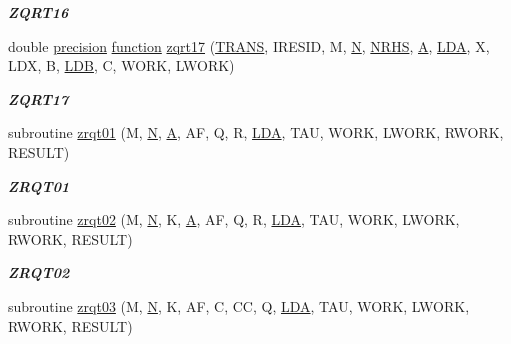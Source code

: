 \begin{DoxyCompactItemize}
\begin{DoxyCompactList}\small\item\em {\bfseries Z\+Q\+R\+T16} \end{DoxyCompactList}\item 
double \hyperlink{numinquire_8h_a2c8e616467665d0b2814d4c1589ba74e}{precision} \hyperlink{afunc_8m_a7b5e596df91eadea6c537c0825e894a7}{function} \hyperlink{group__complex16__lin_gac400f687a11cf24428b87a8fa7076690}{zqrt17} (\hyperlink{superlu__enum__consts_8h_a0c4e17b2d5cea33f9991ccc6a6678d62a1f61e3015bfe0f0c2c3fda4c5a0cdf58}{T\+R\+A\+N\+S}, I\+R\+E\+S\+I\+D, M, \hyperlink{polmisc_8c_a0240ac851181b84ac374872dc5434ee4}{N}, \hyperlink{example__user_8c_aa0138da002ce2a90360df2f521eb3198}{N\+R\+H\+S}, \hyperlink{classA}{A}, \hyperlink{example__user_8c_ae946da542ce0db94dced19b2ecefd1aa}{L\+D\+A}, X, L\+D\+X, B, \hyperlink{example__user_8c_a50e90a7104df172b5a89a06c47fcca04}{L\+D\+B}, C, W\+O\+R\+K, L\+W\+O\+R\+K)
\begin{DoxyCompactList}\small\item\em {\bfseries Z\+Q\+R\+T17} \end{DoxyCompactList}\item 
subroutine \hyperlink{group__complex16__lin_ga78ebdcd03690e02b1da5ce6fa7b1b25c}{zrqt01} (M, \hyperlink{polmisc_8c_a0240ac851181b84ac374872dc5434ee4}{N}, \hyperlink{classA}{A}, A\+F, Q, R, \hyperlink{example__user_8c_ae946da542ce0db94dced19b2ecefd1aa}{L\+D\+A}, T\+A\+U, W\+O\+R\+K, L\+W\+O\+R\+K, R\+W\+O\+R\+K, R\+E\+S\+U\+L\+T)
\begin{DoxyCompactList}\small\item\em {\bfseries Z\+R\+Q\+T01} \end{DoxyCompactList}\item 
subroutine \hyperlink{group__complex16__lin_ga19147017ea28c048ca6b1febe831e689}{zrqt02} (M, \hyperlink{polmisc_8c_a0240ac851181b84ac374872dc5434ee4}{N}, K, \hyperlink{classA}{A}, A\+F, Q, R, \hyperlink{example__user_8c_ae946da542ce0db94dced19b2ecefd1aa}{L\+D\+A}, T\+A\+U, W\+O\+R\+K, L\+W\+O\+R\+K, R\+W\+O\+R\+K, R\+E\+S\+U\+L\+T)
\begin{DoxyCompactList}\small\item\em {\bfseries Z\+R\+Q\+T02} \end{DoxyCompactList}\item 
subroutine \hyperlink{group__complex16__lin_ga4bd01f25f215673bd12964dadced5dc5}{zrqt03} (M, \hyperlink{polmisc_8c_a0240ac851181b84ac374872dc5434ee4}{N}, K, A\+F, C, C\+C, Q, \hyperlink{example__user_8c_ae946da542ce0db94dced19b2ecefd1aa}{L\+D\+A}, T\+A\+U, W\+O\+R\+K, L\+W\+O\+R\+K, R\+W\+O\+R\+K, R\+E\+S\+U\+L\+T)

\end{DoxyCompactItemize}
